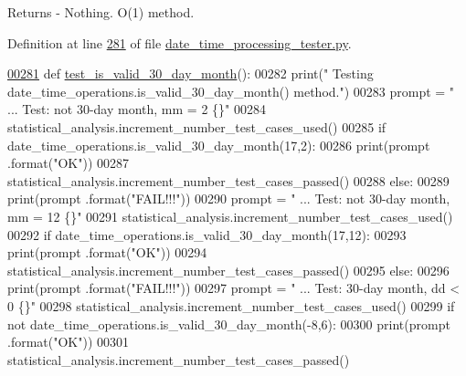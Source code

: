 \begin{DoxyReturn}{Returns}
-\/ Nothing. O(1) method. 
\end{DoxyReturn}


Definition at line \hyperlink{date__time__processing__tester_8py_source_l00281}{281} of file \hyperlink{date__time__processing__tester_8py_source}{date\+\_\+time\+\_\+processing\+\_\+tester.\+py}.


\begin{DoxyCode}
\hypertarget{classutilities_1_1date__time__processing__tester_1_1date__time__operations__tester_l00281}{}\hyperlink{classutilities_1_1date__time__processing__tester_1_1date__time__operations__tester_a1ffc03785cad6313ef55b291e1cbb3d9}{00281}     \textcolor{keyword}{def }\hyperlink{classutilities_1_1date__time__processing__tester_1_1date__time__operations__tester_a1ffc03785cad6313ef55b291e1cbb3d9}{test\_is\_valid\_30\_day\_month}():
00282         print(\textcolor{stringliteral}{" Testing date\_time\_operations.is\_valid\_30\_day\_month() method."})
00283         prompt = \textcolor{stringliteral}{"  ... Test: not 30-day month, mm = 2          \{\}"}
00284         statistical\_analysis.increment\_number\_test\_cases\_used()
00285         \textcolor{keywordflow}{if} date\_time\_operations.is\_valid\_30\_day\_month(17,2):
00286             print(prompt .format(\textcolor{stringliteral}{"OK"}))
00287             statistical\_analysis.increment\_number\_test\_cases\_passed()
00288         \textcolor{keywordflow}{else}:
00289             print(prompt .format(\textcolor{stringliteral}{"FAIL!!!"}))
00290         prompt = \textcolor{stringliteral}{"  ... Test: not 30-day month, mm = 12         \{\}"}
00291         statistical\_analysis.increment\_number\_test\_cases\_used()
00292         \textcolor{keywordflow}{if} date\_time\_operations.is\_valid\_30\_day\_month(17,12):
00293             print(prompt .format(\textcolor{stringliteral}{"OK"}))
00294             statistical\_analysis.increment\_number\_test\_cases\_passed()
00295         \textcolor{keywordflow}{else}:
00296             print(prompt .format(\textcolor{stringliteral}{"FAIL!!!"}))
00297         prompt = \textcolor{stringliteral}{"  ... Test: 30-day month, dd < 0              \{\}"}
00298         statistical\_analysis.increment\_number\_test\_cases\_used()
00299         \textcolor{keywordflow}{if} \textcolor{keywordflow}{not} date\_time\_operations.is\_valid\_30\_day\_month(-8,6):
00300             print(prompt .format(\textcolor{stringliteral}{"OK"}))
00301             statistical\_analysis.increment\_number\_test\_cases\_passed()

\end{DoxyCode}
